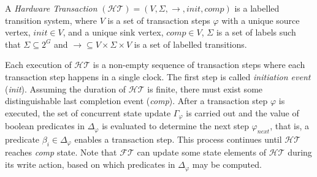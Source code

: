 \documentclass[sigconf]{acmart}
\begin{document}
A {\em Hardware Transaction} $(\mathcal{HT}) = (V, \Sigma, \rightarrow, init,
comp)$ is a labelled transition system, where $V$ is a set of transaction steps
$\varphi$ with a unique source vertex, $init \in V$, and a unique sink vertex, 
$comp \in V$, $\Sigma$ is a set of labels such that $\Sigma \subseteq 2^{G}$ and  
$\rightarrow \subseteq V \times \Sigma \times V$ is a set of labelled
transitions.

Each execution of $\mathcal{HT}$ is a non-empty 
sequence of transaction steps where each transaction step 
happens in a single clock. The first step is called {\em initiation event}
(\textit{init}). Assuming the duration of $\mathcal{HT}$ is finite, 
there must exist some distinguishable last completion event (\textit{comp}). 
After a transaction step $\varphi$ is executed, the set of concurrent state
update $\Gamma_{\varphi}$ is carried out and the value of boolean predicates
in $\Delta_{\varphi}$ is evaluated to determine the next step
$\varphi_{next}$, that is, a predicate $\beta_i \in \Delta_{\varphi}$
enables a transaction step.  This process continues until $\mathcal{HT}$
reaches \textit{comp} state.  Note that $\mathcal{FT}$ can update some state
elements of $\mathcal{HT}$ during its write action, based on which
predicates in $\Delta_{\varphi}$ may be computed. 
\end{document}
